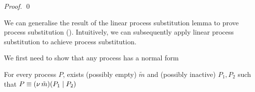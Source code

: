 \begin{proof}
\begin{comment}
%
	\noi and $t'$ a fresh name. From the freshness of $t$ and the fact that $X$ is linear in $Q_2$
	it has to be the case that:
%
	\[
		\begin{array}{crll}
			& \Gamma; \es; \Delta_2'&  \proves &
			\newsp{\widetilde{m_2'}}{Q_1 \Par Q_2 \subst{\auxtr{t}}{x}}\\
			\Hby{\ell_2}& & &
			\newsp{\widetilde{m_2'}}{Q_1'' \Par Q_3 \Par \appl{x}{\widetilde{m}} \subst{\auxtr{t}}{x}} \\
			\hby{\bactinp{t}{\abs{\widetilde{x}}{\binp{t'}{y} \appl{y}{\widetilde{x}}}}}
			&\Delta_2''& \proves& \newsp{\widetilde{m_2'}}{Q_1' \Par \appl{x}{\widetilde{m}} \subst{\abs{\widetilde{x}}{\binp{t'}{y} \appl{y}{\widetilde{x}}}}{x}} \\
		\end{array}
	\]
%
%
	\noi From here the proof is similar with the previous case.
\end{comment}
\qed
\end{proof}

\noindent
We can generalise the result of the linear process substitution lemma
to prove process substitution ().
Intuitively, we can subsequently apply linear process substitution
to achieve process substitution.


We first need to show that any process has a normal form
\begin{lemma}
	For every process $P$, exists (possibly empty) $\tilde{m}$
	and (possibly inactive) $P_1, P_2$ such that
	$P \equiv (\nu\, \tilde{m})(P_1 \;|\; P_2)$
\end{lemma}

